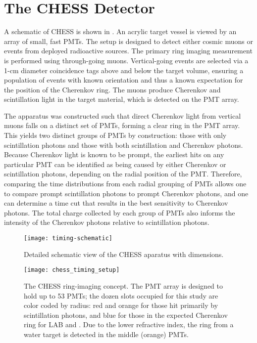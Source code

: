 \section{The CHESS Detector}\label{s:desc}

A schematic of CHESS is shown in .  
An acrylic target vessel is viewed by an array of small, fast PMTs. 
The setup is designed to detect either cosmic muons or events from deployed radioactive sources.  
The primary ring imaging measurement is performed using through-going muons.  
Vertical-going events are selected via a 1-cm diameter coincidence tags above and below the target volume, ensuring a population of events with known orientation and thus a known expectation for the position of the Cherenkov ring. 
The muons produce Cherenkov and scintillation light in the target material, which is detected on the PMT array. 

The apparatus was constructed such that direct Cherenkov light from vertical muons falls on a distinct set of PMTs, forming a clear ring in the PMT array.
This yields two distinct groups of PMTs by construction: those with only scintillation photons and those with both scintillation and Cherenkov photons. 
Because Cherenkov light is known to be prompt, the earliest hits on any particular PMT can be identified as being caused by either Cherenkov or scintillation photons, depending on the radial position of the PMT.
Therefore, comparing the time distributions from each radial grouping of PMTs allows one to compare prompt scintillation photons to prompt Cherenkov photons, and one can determine a time cut that results in the best sensitivity to Cherenkov photons.
The total charge collected by each group of PMTs also informs the intensity of the Cherenkov photons relative to scintillation photons.

\begin{figure}
\centering
\texttt{[image: timing-schematic]}
\caption{Detailed schematic view of the CHESS aparatus with dimensions.}
\label{fig:timing-setup}
\end{figure}

\begin{figure}
\centering
\texttt{[image: chess\_timing\_setup]}
\caption{The CHESS ring-imaging concept. The PMT array is designed to hold up to 53 PMTs; the dozen slots occupied for this study are color coded by radius: red and orange for those hit primarily by scintillation photons, and blue for those in the expected Cherenkov ring for LAB and {\labppo}. Due to the lower refractive index, the ring from a water target is detected in the middle (orange) PMTs. }
\label{fig:timing-setup-2}
\end{figure}

